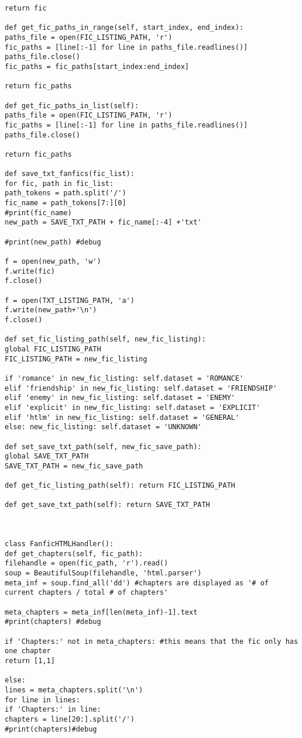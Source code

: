 \documentclass{pre-tfg}
\begin{document}
\begin{lstlisting}[style=consola]
return fic

def get_fic_paths_in_range(self, start_index, end_index):
paths_file = open(FIC_LISTING_PATH, 'r')
fic_paths = [line[:-1] for line in paths_file.readlines()]
paths_file.close()
fic_paths = fic_paths[start_index:end_index]

return fic_paths

def get_fic_paths_in_list(self):
paths_file = open(FIC_LISTING_PATH, 'r')
fic_paths = [line[:-1] for line in paths_file.readlines()]
paths_file.close()

return fic_paths

def save_txt_fanfics(fic_list):
for fic, path in fic_list:
path_tokens = path.split('/')
fic_name = path_tokens[7:][0]
#print(fic_name)
new_path = SAVE_TXT_PATH + fic_name[:-4] +'txt'

#print(new_path) #debug

f = open(new_path, 'w')
f.write(fic)
f.close()

f = open(TXT_LISTING_PATH, 'a')
f.write(new_path+'\n')
f.close()

def set_fic_listing_path(self, new_fic_listing):
global FIC_LISTING_PATH
FIC_LISTING_PATH = new_fic_listing

if 'romance' in new_fic_listing: self.dataset = 'ROMANCE'
elif 'friendship' in new_fic_listing: self.dataset = 'FRIENDSHIP'
elif 'enemy' in new_fic_listing: self.dataset = 'ENEMY'
elif 'explicit' in new_fic_listing: self.dataset = 'EXPLICIT'
elif 'htlm' in new_fic_listing: self.dataset = 'GENERAL'
else: new_fic_listing: self.dataset = 'UNKNOWN'

def set_save_txt_path(self, new_fic_save_path):
global SAVE_TXT_PATH
SAVE_TXT_PATH = new_fic_save_path

def get_fic_listing_path(self): return FIC_LISTING_PATH

def get_save_txt_path(self): return SAVE_TXT_PATH



class FanficHTMLHandler():
def get_chapters(self, fic_path):
filehandle = open(fic_path, 'r').read()
soup = BeautifulSoup(filehandle, 'html.parser')
meta_inf = soup.find_all('dd') #chapters are displayed as '# of current chapters / total # of chapters'

meta_chapters = meta_inf[len(meta_inf)-1].text
#print(chapters) #debug

if 'Chapters:' not in meta_chapters: #this means that the fic only has one chapter
return [1,1]

else:
lines = meta_chapters.split('\n')
for line in lines:
if 'Chapters:' in line:
chapters = line[20:].split('/')
#print(chapters)#debug


\end{lstlisting}
\end{document}
